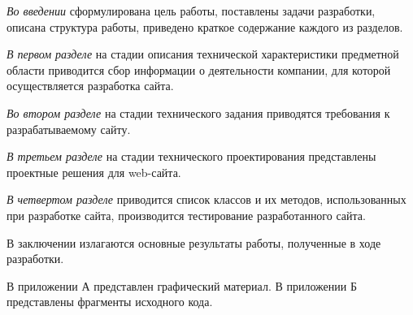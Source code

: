 \emph{Во введении} сформулирована цель работы, поставлены задачи разработки, описана структура работы, приведено краткое содержание каждого из разделов.

\emph{В первом разделе} на стадии описания технической характеристики предметной области приводится сбор информации о деятельности компании, для которой осуществляется разработка сайта.

\emph{Во втором разделе} на стадии технического задания приводятся требования к разрабатываемому сайту.

\emph{В третьем разделе} на стадии технического проектирования представлены проектные решения для web-сайта.

\emph{В четвертом разделе} приводится список классов и их методов, использованных при разработке сайта, производится тестирование разработанного сайта.

В заключении излагаются основные результаты работы, полученные в ходе разработки.

В приложении А представлен графический материал.
В приложении Б представлены фрагменты исходного кода. 
